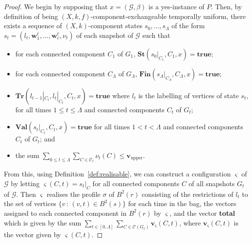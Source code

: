 \documentclass[10pt,a4paper]{amsart}
\begin{document}
\begin{proof}
    We begin by supposing that $x=(\mathcal{G},\beta)$ is a yes-instance of $P$. Then, by definition of being $(X,k,f)$-component-exchangeable temporally uniform, there exists a sequence of $(X,k)$-component states $s_0,\ldots,s_{\Lambda}$ of the form $s_t=(l_t,\textbf{w}^t_1,\ldots,\textbf{w}^t_c, \nu_t)$ of each snapshot of $\mathcal{G}$ such that 
    \begin{itemize}
        \item for each connected component $C_1$ of $G_1$, $\textbf{St}(s_0|_{C_1},C_1,x)=\textbf{true}$;
        \item for each connected component $C_{\Lambda}$ of $G_{\Lambda}$, $\textbf{Fin}(s_{\Lambda}|_{C_{\Lambda}},C_{\Lambda},x)=\textbf{true}$;
        \item $\textbf{Tr}(l_{t-1}|_{C_t}, l_t|_{C_t}, C_t,x)=\textbf{true}$ where $l_t$ is the labelling of vertices of state $s_t$, for all times $1 \leq t \leq \Lambda$ and connected components $C_t$ of $G_t$;
        \item $\textbf{Val}(s_t|_{C_t}, C_t,x)=\textbf{true}$ for all times $1 < t < \Lambda$ and connected components $C_t$ of $G_t$; and
        \item the sum $\sum_{0\leq t\leq \Lambda} \sum_{C \in\mathcal{C}_t}\nu_{t} (C)\leq \textbf{v}_{\text{upper}}$.
    \end{itemize}
    From this, using Definition~\ref{def:realisable}, we can construct a configuration $\varsigma$ of $\mathcal{G}$ by letting $\varsigma(C,t)=s_t|_C$ for all connected components $C$ of all snapshots $G_t$ of $\mathcal{G}$. Then $\varsigma$ realises the profile $\sigma$ of $B^2(r)$ consisting of the restrictions of $l_t$ to the set of vertices $\{v \,:\,(v,t)\in B^2(s)\}$ for each time in the bag, the vectors assigned to each connected component in $B^2(r)$ by $\varsigma$, and the vector \textbf{total} which is given by the sum $\sum_{t\in [0,\Lambda]}\sum_{C\in\mathcal{C}(G_t)}\textbf{v}_{\varsigma}(C,t)$, where $\textbf{v}_{\varsigma}(C,t)$ is the vector given by $\varsigma(C,t)$.


\end{proof}
\end{document}
